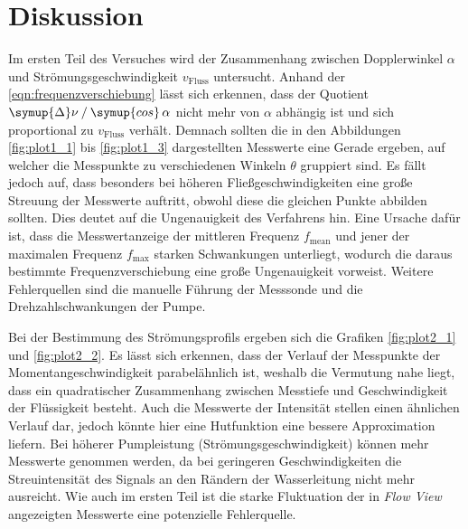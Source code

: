 \section{Diskussion}
\label{sec:Diskussion}
Im ersten Teil des Versuches wird der Zusammenhang zwischen Dopplerwinkel $\alpha$ und Strömungsgeschwindigkeit $v_\text{Fluss}$ untersucht. 
Anhand der \autoref{eqn:frequenzverschiebung} lässt sich erkennen, dass der Quotient $\symup{\Delta}\nu \mathbin{/} \symup{cos}\, \alpha$
nicht mehr von $\alpha$ abhängig ist und sich proportional zu $v_\text{Fluss}$ verhält. Demnach sollten die in den Abbildungen \ref{fig:plot1_1}
bis \ref{fig:plot1_3} dargestellten Messwerte eine Gerade ergeben, auf welcher die Messpunkte zu verschiedenen Winkeln $\theta$ gruppiert sind.
Es fällt jedoch auf, dass besonders bei höheren Fließgeschwindigkeiten eine große Streuung der Messwerte auftritt, obwohl diese die gleichen
Punkte abbilden sollten.
Dies deutet auf die Ungenauigkeit des Verfahrens hin. Eine Ursache dafür ist, dass die Messwertanzeige der mittleren Frequenz $f_\text{mean}$ und
jener der maximalen Frequenz $f_\text{max}$ starken Schwankungen unterliegt, wodurch die daraus bestimmte Frequenzverschiebung eine große Ungenauigkeit
vorweist. Weitere Fehlerquellen sind die manuelle Führung der Messsonde und die Drehzahlschwankungen der Pumpe. 

Bei der Bestimmung des Strömungsprofils ergeben sich die Grafiken \ref{fig:plot2_1} und \ref{fig:plot2_2}. Es lässt sich erkennen, dass der Verlauf der
Messpunkte der Momentangeschwindigkeit parabelähnlich ist, weshalb die Vermutung nahe liegt, dass ein quadratischer Zusammenhang zwischen Messtiefe und
Geschwindigkeit der Flüssigkeit besteht. Auch die Messwerte der Intensität stellen einen ähnlichen Verlauf dar, jedoch könnte hier eine Hutfunktion
eine bessere Approximation liefern. Bei höherer Pumpleistung (Strömungsgeschwindigkeit) können mehr Messwerte genommen werden, da bei geringeren 
Geschwindigkeiten die Streuintensität des Signals an den Rändern der Wasserleitung nicht mehr ausreicht. Wie auch im ersten Teil ist die starke 
Fluktuation der in \textit{Flow View} angezeigten Messwerte eine potenzielle Fehlerquelle. 
